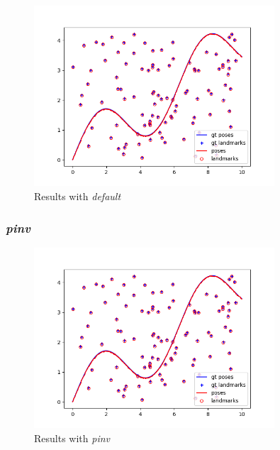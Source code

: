 \documentclass[12pt, a4paper]{article}
\begin{document}
\begin{figure}[H]
  \centering
  \includegraphics[width=0.8\textwidth]{./results/linear/default_2d_linear_map.png}
  \caption{Results with \textit{default}}
\end{figure}
\subsubsection{\textit{pinv}}

\begin{figure}[H]
  \centering
  \includegraphics[width=0.8\textwidth]{./results/linear/pinv_2d_linear_map.png}
  \caption{Results with \textit{pinv}}
\end{figure}
\end{document}
